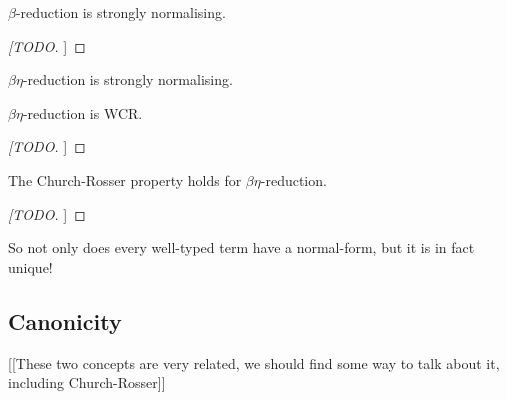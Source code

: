 \begin{theorem}
    $\beta$-reduction is strongly normalising.
\end{theorem}

\begin{proof}
    [[TODO]]
\end{proof}

\begin{cor}
    $\beta \eta$-reduction is strongly normalising.
\end{cor}

\begin{lemma}
    $\beta \eta$-reduction is WCR.
\end{lemma}

\begin{proof}
    [[TODO]]
\end{proof}

\begin{theorem}
    The Church-Rosser property holds for $\beta \eta$-reduction.
\end{theorem}

\begin{proof}
    [[TODO]]
\end{proof}

\begin{remark}
    So not only does every well-typed term have a normal-form, but it is in fact unique!
\end{remark}

\subsection{Canonicity}



[[These two concepts are very related, we should find some way to talk about it, including Church-Rosser]]
